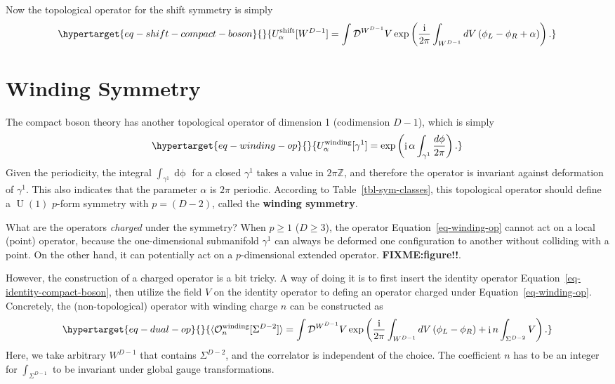 \documentclass[
  letterpaper,
  DIV=11,
  numbers=noendperiod]{scrreport}
\DeclareMathOperator{\U}{U}
\DeclareMathOperator{\imunit}{i}
\newcommand{\stdim}{D}
\begin{document}
Now the topological operator for the shift symmetry is simply
\begin{equation}\protect\hypertarget{eq-shift-compact-boson}{}{
    U_\alpha^\text{shift}[{W^{\stdim-1}}] = \int \mathcal{D}^{W^{\stdim-1}}V \exp\left(\frac{\imunit}{2\pi}\int_{W^{\stdim-1}} \mathop{dV}\left(\phi_L-\phi_R + \alpha\right)\right).
}\label{eq-shift-compact-boson}\end{equation}

\hypertarget{winding-symmetry}{%
\section{Winding Symmetry}\label{winding-symmetry}}

The compact boson theory has another topological operator of dimension 1
(codimension \(\stdim-1\)), which is simply
\begin{equation}\protect\hypertarget{eq-winding-op}{}{
U^\text{winding}_\alpha[\gamma^1] = \exp\left(\imunit\alpha \int_{\gamma^1}\frac{\mathop{d\phi}}{2\pi}\right).
}\label{eq-winding-op}\end{equation} Given the periodicity, the integral
\(\int_{\gamma^1}\mathop{d\phi}\) for a closed \(\gamma^1\) takes a
value in \(2\pi \mathbb{Z}\), and therefore the operator is invariant
against deformation of \(\gamma^1\). This also indicates that the
parameter \(\alpha\) is \(2\pi\) periodic. According to
Table~\ref{tbl-sym-classes}, this topological operator should define a
\(\U(1)\) \(p\)-form symmetry with \(p=(\stdim-2)\), called the
\textbf{winding symmetry}.

What are the operators \emph{charged} under the symmetry? When
\(p \ge 1\) (\(\stdim\ge 3\)), the operator Equation~\ref{eq-winding-op}
cannot act on a local (point) operator, because the one-dimensional
submanifold \(\gamma^1\) can always be deformed one configuration to
another without colliding with a point. On the other hand, it can
potentially act on a \(p\)-dimensional extended operator.
\textbf{FIXME:figure!!}.

However, the construction of a charged operator is a bit tricky. A way
of doing it is to first insert the identity operator
Equation~\ref{eq-identity-compact-boson}, then utilize the field \(V\)
on the identity operator to defing an operator charged under
Equation~\ref{eq-winding-op}. Concretely, the (non-topological) operator
with winding charge \(n\) can be constructed as
\begin{equation}\protect\hypertarget{eq-dual-op}{}{
\langle \mathcal{O}^\text{winding}_n[\Sigma^{D-2}] \rangle
= \int \mathcal{D}^{W^{\stdim-1}}V \exp\left(\frac{\imunit}{2\pi}\int_{W^{\stdim-1}} \mathop{dV}\left(\phi_L-\phi_R\right)+\imunit n \int_{\Sigma^{\stdim-2}}V\right).
}\label{eq-dual-op}\end{equation} Here, we take arbitrary
\(W^{\stdim-1}\) that contains \(\Sigma^{\stdim-2}\), and the correlator
is independent of the choice. The coefficient \(n\) has to be an integer
for \(\int_{\Sigma^{D-1}}\) to be invariant under global gauge
transformations.
\end{document}
